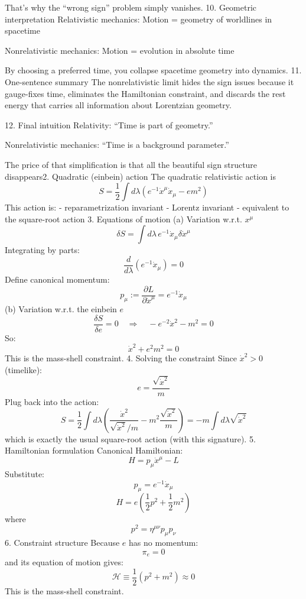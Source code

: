 That’s why the “wrong sign” problem simply vanishes.
10. Geometric interpretation
Relativistic mechanics:
Motion = geometry of worldlines in spacetime

Nonrelativistic mechanics:
Motion = evolution in absolute time

By choosing a preferred time, you collapse spacetime geometry into dynamics.
11. One-sentence summary
The nonrelativistic limit hides the sign issues because it gauge-fixes time, eliminates the Hamiltonian constraint, and discards the rest energy that carries all information about Lorentzian geometry.

12. Final intuition
Relativity:
“Time is part of geometry.”

Nonrelativistic mechanics:
“Time is a background parameter.”

The price of that simplification is that all the beautiful sign structure disappears2. Quadratic (einbein) action
The quadratic relativistic action is
\[
S = \frac{1}{2} \int d\lambda 
\left(
e^{-1} \dot x^\mu \dot x_\mu - e m^2
\right)
\]
This action is:
- reparametrization invariant
- Lorentz invariant
- equivalent to the square-root action
3. Equations of motion
(a) Variation w.r.t. \(x^\mu\)
\[
\delta S = \int d\lambda\, e^{-1} \dot x_\mu \delta \dot x^\mu
\]
Integrating by parts:
\[
\frac{d}{d\lambda} (e^{-1} \dot x_\mu) = 0
\]
Define canonical momentum:
\[
p_\mu := \frac{\partial L}{\partial \dot x^\mu} = e^{-1} \dot x_\mu
\]
(b) Variation w.r.t. the einbein \(e\)
\[
\frac{\delta S}{\delta e} = 0
\quad\Rightarrow\quad
- e^{-2} \dot x^2 - m^2 = 0
\]
So:
\[
\dot x^2 + e^2 m^2 = 0
\]
This is the mass-shell constraint.
4. Solving the constraint
Since \(\dot x^2 > 0\) (timelike):
\[
e = \frac{\sqrt{\dot x^2}}{m}
\]
Plug back into the action:
\[
S = \frac{1}{2} \int d\lambda
\left(
\frac{\dot x^2}{\sqrt{\dot x^2}/m}
- m^2 \frac{\sqrt{\dot x^2}}{m}
\right)
= - m \int d\lambda \sqrt{\dot x^2}
\]
which is exactly the usual square-root action (with this signature).
5. Hamiltonian formulation
Canonical Hamiltonian:
\[
H = p_\mu \dot x^\mu - L
\]
Substitute:
\[
p_\mu = e^{-1} \dot x_\mu
\]
\[
H = e \left( \frac{1}{2} p^2 + \frac{1}{2} m^2 \right)
\]
where
\[
p^2 = \eta^{\mu\nu} p_\mu p_\nu
\]
6. Constraint structure
Because \(e\) has no momentum:
\[
\pi_e = 0
\]
and its equation of motion gives:
\[
\mathcal{H} \equiv \frac{1}{2}(p^2 + m^2) \approx 0
\]
This is the mass-shell constraint.

